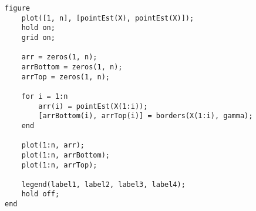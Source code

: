 \begin{lstlisting}[caption=Текст программы]
    figure
    plot([1, n], [pointEst(X), pointEst(X)]);
    hold on;
    grid on;

    arr = zeros(1, n);
    arrBottom = zeros(1, n);
    arrTop = zeros(1, n);

    for i = 1:n
        arr(i) = pointEst(X(1:i));
        [arrBottom(i), arrTop(i)] = borders(X(1:i), gamma);
    end

    plot(1:n, arr);
    plot(1:n, arrBottom);
    plot(1:n, arrTop);

    legend(label1, label2, label3, label4);
    hold off;
end
\end{lstlisting}
